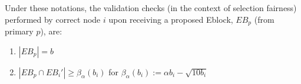 








Under these notations, the validation checks (in the context of selection fairness) performed by correct node $i$ upon receiving a proposed Eblock, $EB_p$ (from primary $p$), are:
\begin{enumerate}
	\item $|EB_p|=b$ \label{validiation_condition_1}
	\item $|EB_p\cap EB_i'|\geq \beta_{\alpha}(b_i)$ for $\beta_{\alpha}(b_i) :=  \alpha b_i-\sqrt{10 b_i}$ \label{validiation_condition_2}
\end{enumerate}

